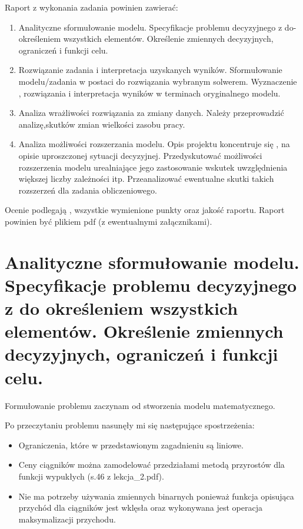\documentclass{article}
\begin{document}
\noindent
Raport z wykonania zadania powinien zawierać:

\begin{enumerate}
    \item Analityczne sformułowanie modelu. Specyfikacje problemu decyzyjnego z do-określeniem wszystkich elementów. Określenie zmiennych decyzyjnych, ograniczeń i funkcji celu.
    \item Rozwiązanie zadania i interpretacja uzyskanych wyników. Sformułowanie modelu/zadania w postaci do rozwiązania wybranym solwerem.  Wyznaczenie , rozwiązania i interpretacja wyników w terminach oryginalnego modelu.
    \item Analiza wrażliwości rozwiązania za zmiany danych. Należy przeprowadzić analizę,skutków zmian wielkości zasobu pracy.
    \item Analiza możliwości rozszerzania modelu. Opis projektu koncentruje się , na opisie uproszczonej sytuacji decyzyjnej. Przedyskutować możliwości rozszerzenia modelu urealniające jego zastosowanie wskutek uwzględnienia większej liczby zależności itp.
      Przeanalizować ewentualne skutki takich rozszerzeń dla zadania obliczeniowego.
\end{enumerate}

Ocenie podlegają , wszystkie wymienione punkty oraz jakość raportu.
Raport powinien być plikiem pdf (z ewentualnymi załącznikami).

\section{Analityczne sformułowanie modelu. Specyfikacje problemu decyzyjnego z do określeniem wszystkich elementów. Określenie zmiennych decyzyjnych, ograniczeń i funkcji celu.}

\noindent
Formułowanie problemu zaczynam od stworzenia modelu matematycznego.

\noindent
Po przeczytaniu problemu nasunęły mi się następujące spostrzeżenia:

\begin{itemize}
	\item Ograniczenia, które w przedstawionym zagadnieniu są liniowe.
	\item Ceny ciągników można zamodelować przedziałami metodą przyrostów dla funkcji wypukłych (s.46 z lekcja\_2.pdf). 
	\item Nie ma potrzeby używania zmiennych binarnych ponieważ funkcja opisująca przychód dla ciągników jest wklęsła oraz wykonywana jest operacja maksymalizacji przychodu.
\end{itemize}
\end{document}
